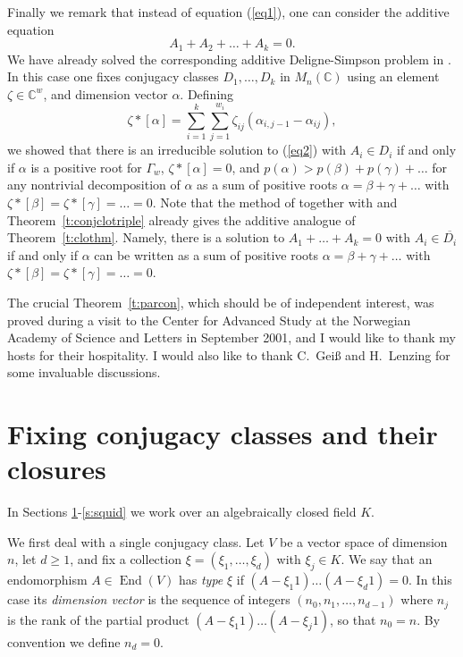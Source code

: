 \documentclass{amsart}
\theoremstyle{plain}
\theoremstyle{definition}
\theoremstyle{remark}
\newcommand{\C}{\mathbb{C}}
\DeclareMathOperator{\End}{End}
\begin{document}
Finally we remark that instead of equation (\ref{eq1}), one can consider the additive equation
%
\begin{equation}\label{eq2}
A_1 + A_2 + \dots + A_k = 0.
\end{equation}
%
We have already solved the corresponding additive Deligne-Simpson problem in \cite{CBad}.
In this case one fixes conjugacy classes
$D_1,\dots,D_k$ in $M_n(\C)$ using an element $\zeta\in\C^w$, and
dimension vector $\alpha$. Defining
\[
\zeta*{[\alpha]} = \sum_{i=1}^k \sum_{j=1}^{w_i} \zeta_{ij}(\alpha_{i,j-1} - \alpha_{ij}),
\]
we showed that there is an irreducible solution to (\ref{eq2}) with $A_i\in D_i$
if and only if $\alpha$ is a positive root for $\Gamma_w$, $\zeta*[\alpha]=0$,
and $p(\alpha) > p(\beta)+p(\gamma)+\dots$ for any nontrivial decomposition
of $\alpha$ as a sum of positive roots $\alpha = \beta+\gamma+\dots$
with $\zeta*[\beta] = \zeta*[\gamma] = \dots = 0$.
Note that the method of \cite{CBad} together with \cite[Theorem 4.4]{CBmm}
and Theorem~\ref{t:conjclotriple} already gives the additive analogue of
Theorem~\ref{t:clothm}. Namely, there is a solution to $A_1+\dots+A_k = 0$ with $A_i\in\overline{D_i}$
if and only if $\alpha$ can be written as a sum of positive roots $\alpha = \beta+\gamma+\dots$
with $\zeta*[\beta] = \zeta*[\gamma] = \dots = 0$.

The crucial Theorem~\ref{t:parcon}, which should be of independent interest,
was proved during a visit to the Center for Advanced Study at the Norwegian
Academy of Science and Letters in September 2001, and I would like to thank
my hosts for their hospitality.
I would also like to thank C.~Gei\ss{} and H.~Lenzing for some invaluable
discussions.





\section{Fixing conjugacy classes and their closures}
\label{s:type}
In Sections \ref{s:type}-\ref{s:squid} we work over an algebraically closed field $K$.

We first deal with a single conjugacy class.
Let $V$ be a vector space of dimension $n$, let $d\ge 1$, and fix a collection
$\xi = (\xi_1,\dots,\xi_d)$ with $\xi_j\in K$.
We say that an endomorphism $A\in \End(V)$ has \emph{type} $\xi$ if
$(A-\xi_1 1)\dots (A-\xi_d 1)=0$.
In this case its \emph{dimension vector}
is the sequence of integers $(n_0,n_1,\dots,n_{d-1})$
where $n_j$ is the rank of the partial product $(A-\xi_1 1)\dots (A-\xi_j 1)$,
so that $n_0=n$. By convention we define $n_d=0$.
\end{document}
